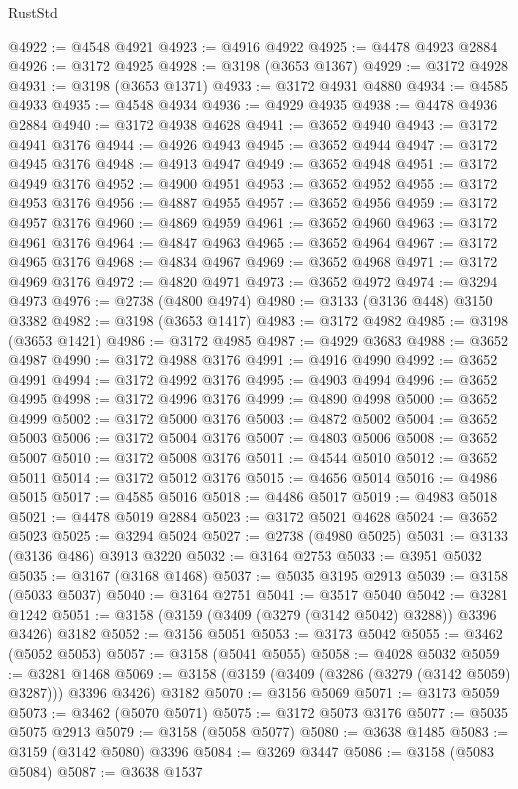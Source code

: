 \begin{lexlean}{RustStd}
\begin{coremodule}
@4922 := @4548 @4921
@4923 := @4916 @4922
@4925 := @4478 @4923 @2884
@4926 := @3172 @4925
@4928 := @3198 (@3653 @1367)
@4929 := @3172 @4928
@4931 := @3198 (@3653 @1371)
@4933 := @3172 @4931 @4880
@4934 := @4585 @4933
@4935 := @4548 @4934
@4936 := @4929 @4935
@4938 := @4478 @4936 @2884
@4940 := @3172 @4938 @4628
@4941 := @3652 @4940
@4943 := @3172 @4941 @3176
@4944 := @4926 @4943
@4945 := @3652 @4944
@4947 := @3172 @4945 @3176
@4948 := @4913 @4947
@4949 := @3652 @4948
@4951 := @3172 @4949 @3176
@4952 := @4900 @4951
@4953 := @3652 @4952
@4955 := @3172 @4953 @3176
@4956 := @4887 @4955
@4957 := @3652 @4956
@4959 := @3172 @4957 @3176
@4960 := @4869 @4959
@4961 := @3652 @4960
@4963 := @3172 @4961 @3176
@4964 := @4847 @4963
@4965 := @3652 @4964
@4967 := @3172 @4965 @3176
@4968 := @4834 @4967
@4969 := @3652 @4968
@4971 := @3172 @4969 @3176
@4972 := @4820 @4971
@4973 := @3652 @4972
@4974 := @3294 @4973
@4976 := @2738 (@4800 @4974)
@4980 := @3133 (@3136 @448) @3150 @3382
@4982 := @3198 (@3653 @1417)
@4983 := @3172 @4982
@4985 := @3198 (@3653 @1421)
@4986 := @3172 @4985
@4987 := @4929 @3683
@4988 := @3652 @4987
@4990 := @3172 @4988 @3176
@4991 := @4916 @4990
@4992 := @3652 @4991
@4994 := @3172 @4992 @3176
@4995 := @4903 @4994
@4996 := @3652 @4995
@4998 := @3172 @4996 @3176
@4999 := @4890 @4998
@5000 := @3652 @4999
@5002 := @3172 @5000 @3176
@5003 := @4872 @5002
@5004 := @3652 @5003
@5006 := @3172 @5004 @3176
@5007 := @4803 @5006
@5008 := @3652 @5007
@5010 := @3172 @5008 @3176
@5011 := @4544 @5010
@5012 := @3652 @5011
@5014 := @3172 @5012 @3176
@5015 := @4656 @5014
@5016 := @4986 @5015
@5017 := @4585 @5016
@5018 := @4486 @5017
@5019 := @4983 @5018
@5021 := @4478 @5019 @2884
@5023 := @3172 @5021 @4628
@5024 := @3652 @5023
@5025 := @3294 @5024
@5027 := @2738 (@4980 @5025)
@5031 := @3133 (@3136 @486) @3913 @3220
@5032 := @3164 @2753
@5033 := @3951 @5032
@5035 := @3167 (@3168 @1468)
@5037 := @5035 @3195 @2913
@5039 := @3158 (@5033 @5037)
@5040 := @3164 @2751
@5041 := @3517 @5040
@5042 := @3281 @1242
@5051 := @3158 (@3159 (@3409 (@3279 (@3142 @5042) @3288)) @3396 @3426) @3182
@5052 := @3156 @5051
@5053 := @3173 @5042
@5055 := @3462 (@5052 @5053)
@5057 := @3158 (@5041 @5055)
@5058 := @4028 @5032
@5059 := @3281 @1468
@5069 := @3158 (@3159 (@3409 (@3286 (@3279 (@3142 @5059) @3287))) @3396 @3426) @3182
@5070 := @3156 @5069
@5071 := @3173 @5059
@5073 := @3462 (@5070 @5071)
@5075 := @3172 @5073 @3176
@5077 := @5035 @5075 @2913
@5079 := @3158 (@5058 @5077)
@5080 := @3638 @1485
@5083 := @3159 (@3142 @5080) @3396
@5084 := @3269 @3447
@5086 := @3158 (@5083 @5084)
@5087 := @3638 @1537

\end{coremodule}
\end{lexlean}
